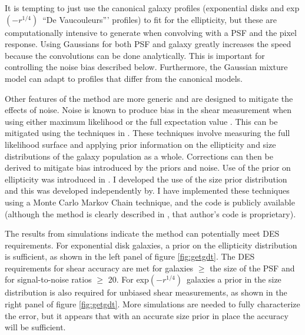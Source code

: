 \documentclass[12pt]{article}
\newcommand{\devauc}{De Vaucouleurs'}
\newcommand{\devprof}{exp$(-r^{1/4})$}
\begin{document}
It is tempting to just use the canonical galaxy profiles (exponential disks and
\devprof\ ``\devauc'' profiles) to fit for the ellipticity, but these are
computationally intensive to generate when convolving with a PSF and the pixel
response.  Using Gaussians for both PSF and galaxy greatly increases the speed
because the convolutions can be done analytically.  This is important for
controlling the noise bias described below.  Furthermore, the Gaussian mixture
model can adapt to profiles that differ from the canonical models.

Other features of the method are more generic and are designed to mitigate the
effects of noise.  Noise is known to produce bias in the shear measurement when
using either maximum likelihood \cite{Refreg12} or the full expectation value
\cite{Miller12}.  This can be mitigated using the techniques in
\cite{Miller07,Miller12}. These techniques involve measuring the full
likelihood surface and applying prior information on the ellipticity and size
distributions of the galaxy population as a whole.  Corrections can then be
derived to mitigate bias introduced by the priors and noise.  Use of the prior
on ellipticity was introduced in \cite{Miller07}. I developed the use of the
size prior distribution and this was developed independently by\cite{Miller12}.
I have implemented these techniques using a Monte Carlo Markov Chain technique,
and the code is publicly available (although the method is clearly described in
\cite{Miller07}, that author's code is proprietary).

The results from simulations indicate the method can potentially meet DES
requirements.  For exponential disk galaxies, a prior on the ellipticity
distribution is sufficient, as shown in the left panel of figure
\ref{fig:getgdt}.  The DES requirements for shear accuracy are met for galaxies
$\geq$ the size of the PSF and for signal-to-noise ratios $\geq$ 20.  For
\devprof\ galaxies a prior in the size distribution is also required for
unbiased shear measurements, as shown in the right panel of figure
\ref{fig:getgdt}.  More simulations are needed to fully characterize the error,
but it appears that with an accurate size prior in place the accuracy will be
sufficient.
\end{document}

